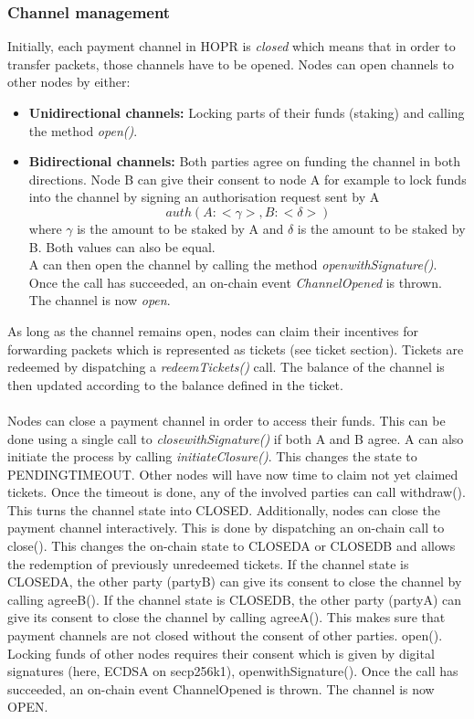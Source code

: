 \subsubsection{Channel management}
Initially, each payment channel in HOPR is \textit{closed} which means that in order to transfer packets, those channels have to be opened. Nodes can open channels to other nodes by either:
\begin{itemize}
<<<<<<< HEAD
    \item \textbf{Unidirectional channels:} Locking parts of their funds (staking) and calling the method \textit{open()}.
    \item \textbf{Bidirectional channels:} Both parties agree on funding the channel in both directions. Node B can give their consent to node A for example to lock funds into the channel by signing an authorisation request sent by A $$auth(A: <\gamma>, B: <\delta>)$$ where $\gamma$ is the amount to be staked by A and $\delta$ is the amount to be staked by B. Both values can also be equal. 
    \\ A can then open the channel by calling the method \textit{openwithSignature()}. Once the call has succeeded, an on-chain event \textit{ChannelOpened} is thrown. The channel is now \textit{open}.
\end{itemize} 
As long as the channel remains open, nodes can claim their incentives for forwarding packets which is represented as tickets (see ticket section). Tickets are redeemed by dispatching a \textit{redeemTickets()} call. The balance of the channel is then updated according to the balance defined in the ticket.
\\~\\Nodes can close a payment channel in order to access their funds. This can be done using a single call to \textit{closewithSignature()} if both A and B agree. A can also initiate the process by calling \textit{initiateClosure()}. This changes the state to PENDINGTIMEOUT. Other nodes will have now time to claim not yet claimed tickets. Once the timeout is done, any of the involved parties can call withdraw(). This turns the channel state into CLOSED. Additionally, nodes can close the payment channel interactively. This is done by dispatching an on-chain call to close(). This changes the on-chain state to CLOSEDA or CLOSEDB and allows the redemption of previously unredeemed tickets. If the channel state is CLOSEDA, the other party (partyB) can give its consent to close the channel by calling agreeB(). If the channel state is CLOSEDB, the other party (partyA) can give its consent to close the channel by calling agreeA(). This makes sure that payment channels are not closed without the consent of other parties.
open(). Locking funds of other nodes requires their consent which is given by digital signatures (here, ECDSA on secp256k1), openwithSignature(). Once the call has succeeded, an on-chain event ChannelOpened is thrown. The channel is now OPEN.

